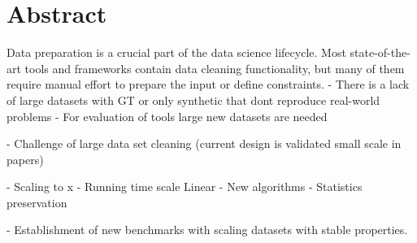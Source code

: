 \chapter*{Abstract}

Data preparation is a crucial part of the data science lifecycle.
Most state-of-the-art tools and frameworks contain data cleaning functionality, 
but many of them require manual effort to prepare the input or define constraints.
- There is a lack of large datasets with GT or only synthetic that dont reproduce real-world problems
- For evaluation of tools large new datasets are needed

- Challenge of large data set cleaning (current design is validated small scale in papers)

- Scaling to x
- Running time scale Linear
- New algorithms
- Statistics preservation

- Establishment of new benchmarks with scaling datasets with stable properties.


\newpage\null\thispagestyle{empty}\newpage
